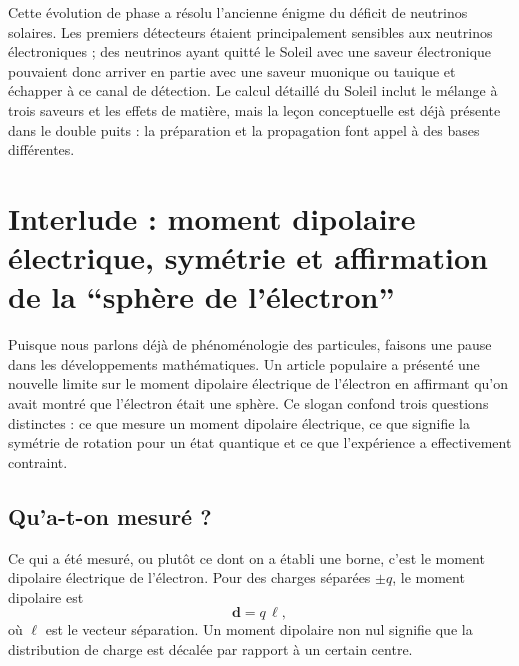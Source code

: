 \begin{classroomqa}\end{classroomqa}

Cette évolution de phase a résolu l’ancienne énigme du déficit de neutrinos solaires. Les premiers détecteurs étaient principalement sensibles aux neutrinos électroniques ; des neutrinos ayant quitté le Soleil avec une saveur électronique pouvaient donc arriver en partie avec une saveur muonique ou tauique et échapper à ce canal de détection. Le calcul détaillé du Soleil inclut le mélange à trois saveurs et les effets de matière, mais la leçon conceptuelle est déjà présente dans le double puits : la préparation et la propagation font appel à des bases différentes.

\section{Interlude : moment dipolaire électrique, symétrie et affirmation de la ``sphère de l’électron''}

Puisque nous parlons déjà de phénoménologie des particules, faisons une pause dans les développements mathématiques. Un article populaire a présenté une nouvelle limite sur le moment dipolaire électrique de l’électron en affirmant qu’on avait montré que l’électron était une sphère. Ce slogan confond trois questions distinctes : ce que mesure un moment dipolaire électrique, ce que signifie la symétrie de rotation pour un état quantique et ce que l’expérience a effectivement contraint.

\subsection{Qu’a-t-on mesuré ?}

Ce qui a été mesuré, ou plutôt ce dont on a établi une borne, c’est le moment dipolaire électrique de l’électron. Pour des charges séparées \(\pm q\), le moment dipolaire est \begin{equation}
\mathbf d = q\,\boldsymbol{\ell},
\end{equation}où \(\boldsymbol{\ell}\) est le vecteur séparation. Un moment dipolaire non nul signifie que la distribution de charge est décalée par rapport à un certain centre.

